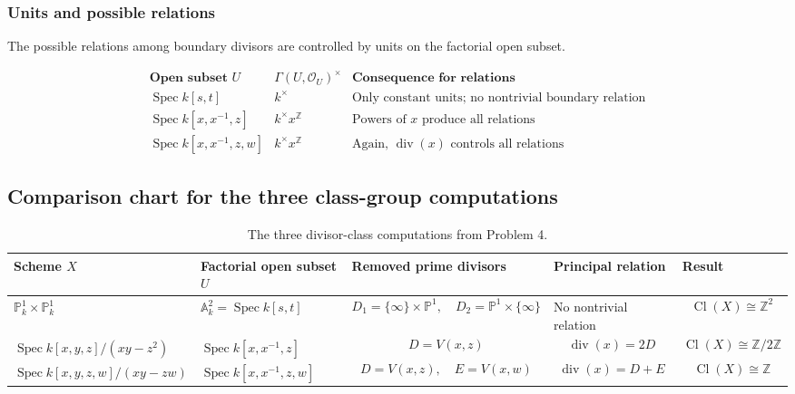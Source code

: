 \documentclass[12pt,a4paper]{article}
\DeclareMathOperator{\Spec}{Spec}
\newcommand{\OO}{\mathcal{O}}
\newcommand{\divisor}{\operatorname{div}}
\newcommand{\Z}{\mathbb{Z}}
\newcommand{\Cl}{\operatorname{Cl}}
\providecommand{\Spec}{\operatorname{Spec}}
\providecommand{\A}{\mathbb A}
\providecommand{\Pj}{\mathbb P}
\theoremstyle{notespace}
\begin{document}
\subsubsection{Units and possible relations}

The possible relations among boundary divisors are controlled by units on the factorial open subset.

\[
\begin{array}{c|c|c}
	\textbf{Open subset }U
	&
	\Gamma(U,\OO_U)^\times
	&
	\textbf{Consequence for relations}
	\\
	\hline
	\Spec k[s,t]
	&
	k^\times
	&
	\text{Only constant units; no nontrivial boundary relation}
	\\[4pt]
	\Spec k[x,x^{-1},z]
	&
	k^\times x^{\Z}
	&
	\text{Powers of }x\text{ produce all relations}
	\\[4pt]
	\Spec k[x,x^{-1},z,w]
	&
	k^\times x^{\Z}
	&
	\text{Again, }\divisor(x)\text{ controls all relations}
\end{array}
\]

\subsection{Comparison chart for the three class-group computations}

\renewcommand{\arraystretch}{1.35}
\begin{table}[htbp]
	\centering
	\begin{adjustbox}{max width=\textwidth}
		\begin{tabular}{|p{3.8cm}|p{3.4cm}|p{3.7cm}|p{3.2cm}|p{3.3cm}|}
			\hline
			\textbf{Scheme \(X\)}
			&
			\textbf{Factorial open subset \(U\)}
			&
			\textbf{Removed prime divisors}
			&
			\textbf{Principal relation}
			&
			\textbf{Result}
			\\
			\hline
			\(\Pj^1_k\times\Pj^1_k\)
			&
			\(\A^2_k=\Spec k[s,t]\)
			&
			\[
			D_1=\{\infty\}\times\Pj^1,
			\quad
			D_2=\Pj^1\times\{\infty\}
			\]
			&
			No nontrivial relation
			&
			\[
			\Cl(X)\cong\Z^2
			\]
			\\
			\hline
			\(\Spec k[x,y,z]/(xy-z^2)\)
			&
			\(\Spec k[x,x^{-1},z]\)
			&
			\[
			D=V(x,z)
			\]
			&
			\[
			\divisor(x)=2D
			\]
			&
			\[
			\Cl(X)\cong\Z/2\Z
			\]
			\\
			\hline
			\(\Spec k[x,y,z,w]/(xy-zw)\)
			&
			\(\Spec k[x,x^{-1},z,w]\)
			&
			\[
			D=V(x,z),
			\quad
			E=V(x,w)
			\]
			&
			\[
			\divisor(x)=D+E
			\]
			&
			\[
			\Cl(X)\cong\Z
			\]
			\\
			\hline
		\end{tabular}
	\end{adjustbox}
	\caption{The three divisor-class computations from Problem 4.}
\end{table}
\end{document}
